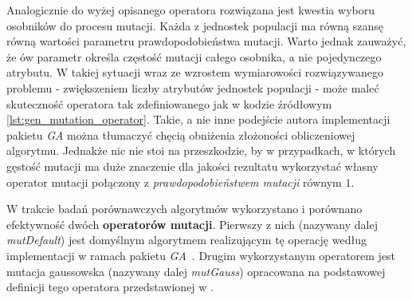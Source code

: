 Analogicznie do wyżej opisanego operatora rozwiązana jest kwestia wyboru osobników do procesu mutacji. Każda z jednostek populacji ma równą szansę równą wartości parametru prawdopodobieństwa mutacji. Warto jednak zauważyć, że ów parametr określa częstość mutacji całego osobnika, a nie pojedynczego atrybutu. W takiej sytuacji wraz ze wzrostem wymiarowości rozwiązywanego problemu - zwiększeniem liczby atrybutów jednostek populacji - może maleć skuteczność operatora tak zdefiniowanego jak w kodzie źródłowym \ref{lst:gen_mutation_operator}. Takie, a nie inne podejście autora implementacji pakietu \emph{GA} można tłumaczyć chęcią obniżenia złożoności obliczeniowej algorytmu. Jednakże nic nie stoi na przeszkodzie, by w przypadkach, w których gęstość mutacji ma duże znaczenie dla jakości rezultatu wykorzystać własny operator mutacji połączony z \emph{prawdopodobieństwem mutacji} równym $1$.


\par
W trakcie badań porównawczych algorytmów wykorzystano i porównano efektywność dwóch \textbf{operatorów mutacji}. Pierwszy z nich (nazywany dalej \emph{mutDefault}) jest domyślnym algorytmem realizującym tę operację według implementacji w ramach pakietu \emph{GA}~\cite{gaPackage}. Drugim wykorzystanym operatorem jest mutacja gaussowska (nazywany dalej \emph{mutGauss}) opracowana na podstawowej definicji tego operatora przedstawionej w \cite{arabas2001wyklady}. 

